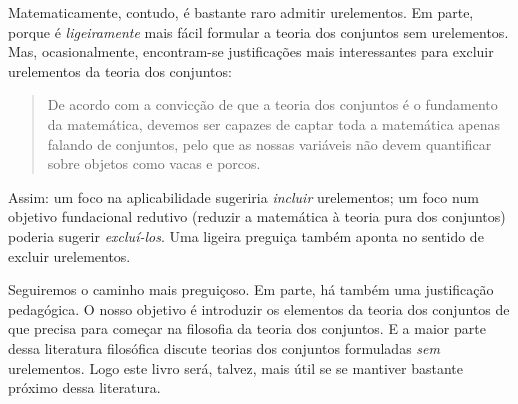 \documentclass[../../../include/open-logic-section]{subfiles}
\begin{document}
Matematicamente, contudo, é bastante raro admitir urelementos. Em
parte, porque é \emph{ligeiramente} mais fácil formular a
teoria dos conjuntos sem urelementos. Mas, ocasionalmente, encontram-se justificações
mais interessantes para excluir urelementos da teoria dos conjuntos:
\begin{quote}
	De acordo com a convicção de que a teoria dos conjuntos é o fundamento da
	matemática, devemos ser capazes de captar toda a matemática
	apenas falando de conjuntos, pelo que as nossas variáveis não devem quantificar sobre
	objetos como vacas e porcos. 
	\citep[p.~8]{Kunen1980}
\end{quote}
Assim: um foco na aplicabilidade sugeriria \emph{incluir}
urelementos; um foco num objetivo fundacional redutivo (reduzir a
matemática à teoria pura dos conjuntos) poderia sugerir \emph{excluí-los}.
Uma ligeira preguiça também aponta no sentido de excluir urelementos. 

Seguiremos o caminho mais preguiçoso. Em parte, há também uma justificação
pedagógica. O nosso objetivo é introduzir os elementos
da teoria dos conjuntos de que precisa para começar na
filosofia da teoria dos conjuntos. E a maior parte dessa literatura filosófica
discute teorias dos conjuntos formuladas \emph{sem} urelementos. Logo este
livro será, talvez, mais útil se se mantiver bastante próximo dessa
literatura.
\end{document}
